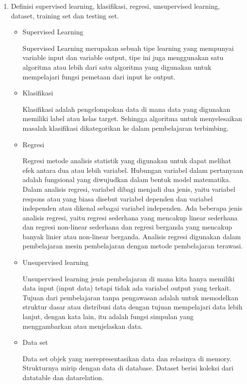 \begin{enumerate}
	\item Definisi supervised learning, klasifikasi, regresi, unsupervised learning, dataset, training set dan testing set.
	\begin{itemize}
	\item Supervised Learning
		\par Supervised Learning merupakan sebuah tipe learning yang mempunyai variable input dan variable output, tipe ini juga menggunakan satu algoritma atau lebih dari satu algoritma yang digunakan untuk mempelajari fungsi  pemetaan dari input ke output.
		
	\item Klasifikasi
		\par Klasifikasi adalah pengelompokan data di mana data yang digunakan memiliki label atau kelas target. Sehingga algoritma untuk menyelesaikan masalah klasifikasi dikategorikan ke dalam pembelajaran terbimbing.
		
	\item Regresi
		\par Regresi metode analisis statistik yang digunakan untuk dapat melihat efek antara dua atau lebih variabel. Hubungan variabel dalam pertanyaan adalah fungsional yang diwujudkan dalam bentuk model matematika. Dalam analisis regresi, variabel dibagi menjadi dua jenis, yaitu variabel respons atau yang biasa disebut variabel dependen dan variabel independen atau dikenal sebagai variabel independen. Ada beberapa jenis analisis regresi, yaitu regresi sederhana yang mencakup linear sederhana dan regresi non-linear sederhana dan regresi berganda yang mencakup banyak linier atau non-linear berganda. Analisis regresi digunakan dalam pembelajaran mesin pembelajaran dengan metode pembelajaran terawasi.
		
	\item Unsupervised learning 
		\par Unsupervised learning jenis pembelajaran di mana kita hanya memiliki data input (input data) tetapi tidak ada variabel output yang terkait. Tujuan dari pembelajaran tanpa pengawasan adalah untuk memodelkan struktur dasar atau distribusi data dengan tujuan mempelajari data lebih lanjut, dengan kata lain, itu adalah fungsi simpulan yang menggambarkan atau menjelaskan data.
		
	\item Data set
		\par Data set objek yang merepresentasikan data dan relasinya di memory. Strukturnya mirip dengan data di database. Dataset berisi koleksi dari datatable dan datarelation.
		

\end{itemize}
\end{enumerate}
